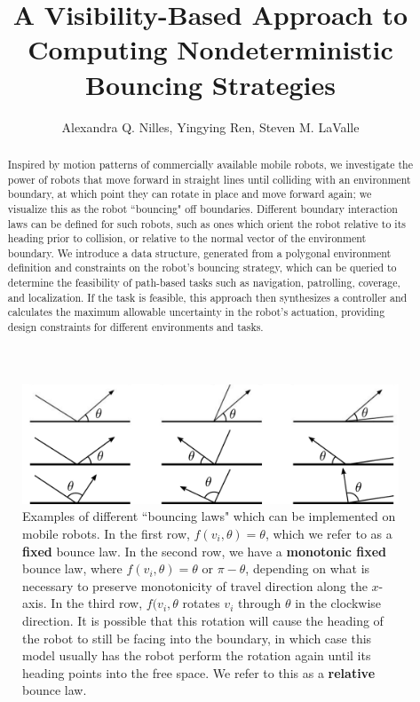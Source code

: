 \documentclass[]{styles/svproc}  %
\title{A Visibility-Based Approach to Computing Nondeterministic Bouncing
Strategies}
\author{Alexandra Q. Nilles, Yingying Ren, Steven M. LaValle%
}
\begin{document}
\maketitle

\begin{abstract}
Inspired by motion patterns of commercially available mobile robots, we investigate the power of robots that 
move forward in straight lines
until colliding with an environment boundary, at which point they can rotate in
place and move forward again; we visualize this as the robot ``bouncing" off
boundaries. Different boundary interaction laws can be
defined for such robots, such as ones which orient the robot relative to its
heading prior to collision, or relative to the normal vector of the environment
boundary. We introduce a data structure, generated from a polygonal environment
 definition and constraints on the robot's bouncing strategy, which can be
queried to determine the feasibility of path-based tasks such as navigation,
patrolling, coverage, and localization. If the task is feasible, this
approach then synthesizes a controller and calculates the maximum allowable 
uncertainty in the robot's actuation, providing design constraints for different 
environments and tasks.
\end{abstract}

\begin{figure}
    \includegraphics[width=0.8\linewidth]{figures/bounce_examples.pdf}
    \centering
    \caption[test]{\label{fig:bex}Examples of different ``bouncing laws" which can be implemented on
mobile robots. In the first row, $f(v_i, \theta) = \theta$, which we refer to
as a \textbf{fixed} bounce law. In the second row, we have a \textbf{monotonic
fixed} bounce law, where
$f(v_i, \theta) = \theta$ or $\pi-\theta$, depending on what is necessary to
preserve monotonicity of travel direction along the $x$-axis. In the third
row, $f(v_i, \theta$ rotates $v_i$ through $\theta$ in the clockwise
direction. It is possible that this rotation will cause the 
heading of the robot to still be facing into the boundary, in which case this model usually has the robot 
perform the rotation again until its heading points into the free space. We
refer to this as a \textbf{relative} bounce law.
}
\end{figure}
\end{document}

